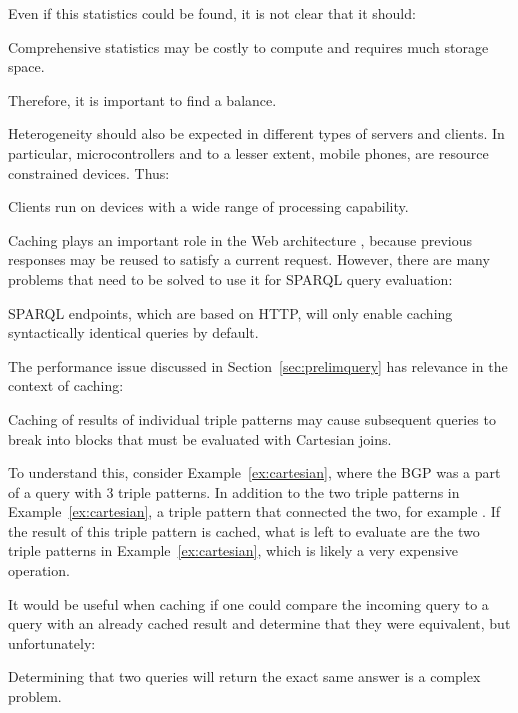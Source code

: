 Even if this statistics could be found, it is not clear that it should:
\begin{problem}\label{prob:largestats}
Comprehensive statistics may be costly to compute and requires much
storage space.
\end{problem}
Therefore, it is important to find a balance.



Heterogeneity should also be expected in different types of servers
and clients. In particular, microcontrollers and to a lesser extent,
mobile phones, are resource constrained devices. Thus:

\begin{problem}\label{prob:microcontroller}
Clients run on devices with a wide range of processing capability.
\end{problem}



Caching plays an important role in the Web architecture
\cite{Jacobs:04:AWW}, because previous responses may be reused to
satisfy a current request. However, there are many problems that need
to be solved to use it for SPARQL query evaluation:

\begin{problem}\label{prob:syntacticcache}
SPARQL endpoints, which are based on HTTP, will only enable caching
syntactically identical queries by  default.
\end{problem}

The performance issue discussed in Section~\ref{sec:prelimquery} has
relevance in the context of caching:

\begin{problem}\label{prob:cachecartesian}
Caching of results of individual triple patterns may cause subsequent
queries to break into blocks that must be evaluated with Cartesian joins.
\end{problem}

To understand this, consider Example~\ref{ex:cartesian}, where the BGP
was a part of a query with 3 triple patterns. In addition to the two
triple patterns in Example~\ref{ex:cartesian}, a triple pattern that
connected the two, for example
. If the result of this
triple pattern is cached, what is left to evaluate are the two triple
patterns in Example~\ref{ex:cartesian}, which is likely a very
expensive operation.

It would be useful when caching if one could compare the incoming
query to a query with an already cached result and determine that they
were equivalent, but unfortunately:
\begin{problem}\label{prob:queryeq}
Determining that two queries will return the exact same answer is a
complex problem.
\end{problem}


